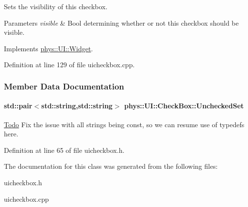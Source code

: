 Sets the visibility of this checkbox. 


\begin{DoxyParams}{Parameters}
{\em visible} & Bool determining whether or not this checkbox should be visible. \\
\hline
\end{DoxyParams}


Implements \hyperlink{classphys_1_1UI_1_1Widget_ab049233d8d5522a6ab42654b8924a3e0}{phys::UI::Widget}.



Definition at line 129 of file uicheckbox.cpp.



\subsubsection{Member Data Documentation}
\hypertarget{classphys_1_1UI_1_1CheckBox_a7b670d93f119193283ec78b94f842429}{
\paragraph[{UncheckedSet}]{\setlength{\rightskip}{0pt plus 5cm}std::pair$<$std::string,std::string$>$ {\bf phys::UI::CheckBox::UncheckedSet}}\hfill}
\label{dd/d10/classphys_1_1UI_1_1CheckBox_a7b670d93f119193283ec78b94f842429}
\begin{Desc}
\item[\hyperlink{todo__todo000026}{Todo}]Fix the issue with all strings being const, so we can resume use of typedefs here. \end{Desc}


Definition at line 65 of file uicheckbox.h.



The documentation for this class was generated from the following files:\begin{DoxyCompactItemize}
\item 
uicheckbox.h\item 
uicheckbox.cpp\end{DoxyCompactItemize}

